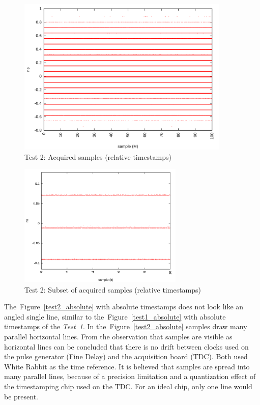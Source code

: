 \documentclass[a4paper, 12pt]{article}
\begin{document}
\begin{figure}[ht!]
  \centering
  \includegraphics[width=0.9\textwidth]{img/test2_samples_relative.png}
  \caption{Test 2: Acquired samples (relative timestamps)}
  \label{test2_relative}
\end{figure}

\begin{figure}[ht!]
  \centering
  \includegraphics[width=0.7\textwidth]{img/test2_samples_relative_zoomxy.png}
  \caption{Test 2: Subset of acquired samples (relative timestamps)}
  \label{test2_relative_zoomy}
\end{figure}

The~Figure~\ref{test2_absolute} with absolute timestamps does not look like
an angled single line, similar to the~Figure~\ref{test1_absolute} with
absolute timestamps of the \textit{Test~1}. In the~Figure~\ref{test2_absolute}
samples draw many parallel horizontal lines. From the observation that samples
are visible as horizontal lines can be concluded that there is no drift between
clocks used on the pulse generator (Fine Delay) and the acquisition board (TDC).
Both used White Rabbit as the time reference.
It is believed that samples are spread into many parallel lines,
because of a precision limitation and a quantization effect of the timestamping
chip used on the TDC.
For an ideal chip, only one line would be present.
\end{document}
